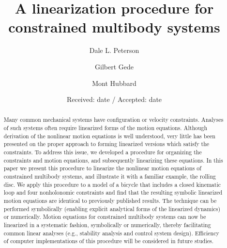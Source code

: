 \documentclass[smallcondensed]{svjour3}                     %
\begin{document}
\title{A linearization procedure for constrained multibody systems}


\author{Dale L. Peterson\and Gilbert Gede\and Mont Hubbard}


\date{Received: date / Accepted: date}

\maketitle

\begin{abstract}
Many common mechanical systems have configuration or velocity constraints.
Analyses of such systems often require linearized forms of the motion
equations.  Although derivation of the nonlinear motion equations is well
understood, very little has been presented on the proper approach to
forming linearized versions which satisfy the constraints.
To address this issue, we developed a procedure for organizing the constraints
and motion equations, and subsequently linearizing these equations.
In this paper we present this procedure to linearize the nonlinear motion
equations of constrained multibody systems, and illustrate it with a familiar
example, the rolling disc.
We apply this procedure to a model of a bicycle that includes a closed
kinematic loop and four nonholonomic constraints and find that the resulting
symbolic linearized motion equations are identical to previously published
results.  The technique can be performed symbolically (enabling explicit
analytical forms of the linearized dynamics) or numerically.
Motion equations for constrained multibody systems can now be linearized in a
systematic fashion, symbolically or numerically, thereby facilitating common
linear analyses (e.g., stability analysis and control system design).
Efficiency of computer implementations of this procedure will be considered in
future studies.
\end{abstract}
\end{document}
